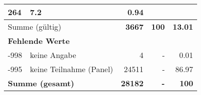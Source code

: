 \begin{longtable}{lXrrr}
       \num{264} &
       \num[round-mode=places,round-precision=2]{7,2} &
         \num[round-mode=places,round-precision=2]{0,94} \\
     \midrule
     \multicolumn{2}{l}{Summe (gültig)} &
       \textbf{\num{3667}} &
     \textbf{100} &
       \textbf{\num[round-mode=places,round-precision=2]{13,01}} \\
     \multicolumn{5}{l}{\textbf{Fehlende Werte}}\\
       -998 &
       keine Angabe &
         \num{4} &
        - &
         \num[round-mode=places,round-precision=2]{0,01} \\
       -995 &
       keine Teilnahme (Panel) &
         \num{24511} &
        - &
         \num[round-mode=places,round-precision=2]{86,97} \\
     \midrule
     \multicolumn{2}{l}{\textbf{Summe (gesamt)}} &
          \textbf{\num{28182}} &
        \textbf{-} &
        \textbf{100} \\
     \bottomrule
     \end{longtable}
     
